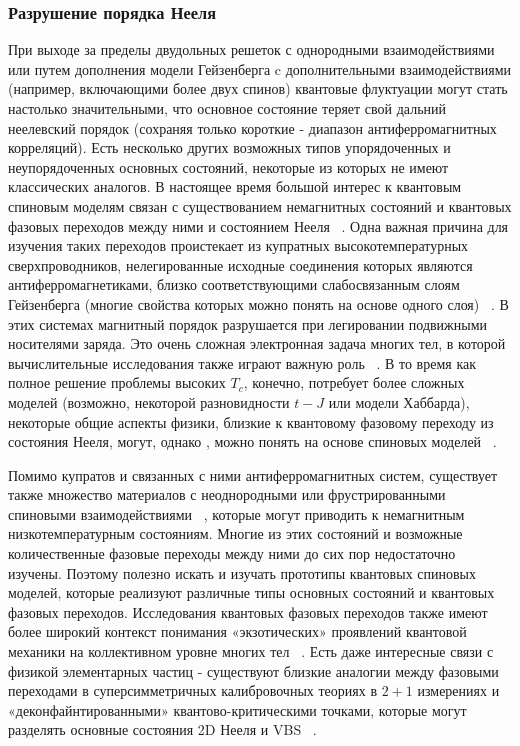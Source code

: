 \documentclass[11pt]{article}
\begin{document}
\subsubsection{Разрушение порядка Нееля}
При выходе за пределы двудольных решеток с однородными взаимодействиями или путем дополнения модели Гейзенберга c дополнительными взаимодействиями (например, включающими более двух спинов) квантовые флуктуации могут стать настолько значительными, что основное состояние теряет свой дальний неелевский порядок (сохраняя только короткие - диапазон антиферромагнитных корреляций). Есть несколько других возможных типов упорядоченных и неупорядоченных основных состояний, некоторые из которых не имеют классических аналогов. В настоящее время большой интерес к квантовым спиновым моделям связан с существованием немагнитных состояний и квантовых фазовых переходов между ними и состоянием Нееля ~\cite{sachdev1}.  Одна важная причина для изучения таких переходов проистекает из купратных высокотемпературных сверхпроводников, нелегированные исходные соединения которых являются антиферромагнетиками, близко соответствующими слабосвязанным слоям Гейзенберга (многие свойства которых можно понять на основе одного слоя) ~\cite{rmp_63_1}. В этих системах магнитный порядок разрушается при легировании подвижными носителями заряда. Это очень сложная электронная задача многих тел, в которой вычислительные исследования также играют важную роль ~\cite{rmp_66_763,psj_76_113708,prb_79_220504}. В то время как полное решение проблемы высоких $T_c$, конечно, потребует более сложных моделей (возможно, некоторой разновидности $t-J$ или модели Хаббарда), некоторые общие аспекты физики, близкие к квантовому фазовому переходу из состояния Нееля, могут, однако , можно понять на основе спиновых моделей ~\cite{rmp_75_913}.

Помимо купратов и связанных с ними антиферромагнитных систем, существует также множество материалов с неоднородными или фрустрированными спиновыми взаимодействиями ~\cite{schol, diep, rmp_82}, которые могут приводить к немагнитным низкотемпературным состояниям. Многие из этих состояний и возможные количественные фазовые переходы между ними до сих пор недостаточно изучены. Поэтому полезно искать и изучать прототипы квантовых спиновых моделей, которые реализуют различные типы основных состояний и квантовых фазовых переходов. Исследования квантовых фазовых переходов также имеют более широкий контекст понимания «экзотических» проявлений квантовой механики на коллективном уровне многих тел ~\cite{sachdev1}. Есть даже интересные связи с физикой элементарных частиц - существуют близкие аналогии между фазовыми переходами в суперсимметричных калибровочных теориях в $2 + 1$ измерениях и «деконфайнтированными» квантово-критическими точками, которые могут разделять основные состояния 2D Нееля и VBS ~\cite{ap_325}.
\end{document}
